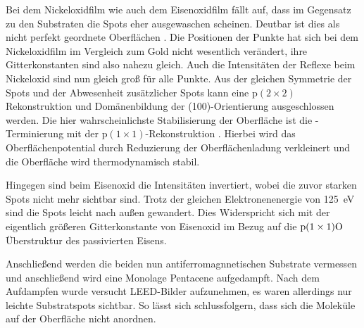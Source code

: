             Bei dem Nickeloxidfilm wie auch dem Eisenoxidfilm fällt auf, dass im Gegensatz zu den Substraten die Spots eher ausgewaschen scheinen.
            Deutbar ist dies als nicht perfekt geordnete Oberflächen \cite{NiO_34}.
            Die Positionen der Punkte hat sich bei dem Nickeloxidfilm im Vergleich zum Gold nicht wesentlich verändert, ihre Gitterkonstanten sind also nahezu gleich.
            Auch die Intensitäten der Reflexe beim Nickeloxid sind nun gleich groß für alle Punkte.
            Aus der gleichen Symmetrie der Spots und der Abwesenheit zusätzlicher Spots kann eine $\text{p}(2 \times 2)$ Rekonstruktion \cite{NiO_37} und Domänenbildung der (100)-Orientierung \cite{NiO_36} ausgeschlossen werden.
            Die hier wahrscheinlichste Stabilisierung der Oberfläche ist die -Terminierung mit der $\text{p}(1 \times 1)$-Rekonstruktion \cite{NiO_35}.
            Hierbei wird das Oberflächenpotential durch Reduzierung der Oberflächenladung verkleinert und die Oberfläche wird thermodynamisch stabil.

            Hingegen sind beim Eisenoxid die Intensitäten invertiert, wobei die zuvor starken Spots nicht mehr sichtbar sind.
            Trotz der gleichen Elektronenenergie von \SI{125}{\electronvolt} sind die Spots leicht nach außen gewandert.
            Dies Widerspricht sich mit der eigentlich größeren Gitterkonstante von Eisenoxid im Bezug auf die $\text{p}(1 \times 1)\ce{O}$ Überstruktur des passivierten Eisens.

            Anschließend werden die beiden nun antiferromagnnetischen Substrate vermessen und anschließend wird eine Monolage Pentacene aufgedampft.
            Nach dem Aufdampfen wurde versucht LEED-Bilder aufzunehmen, es waren allerdings nur leichte Substratspots sichtbar.
            So lässt sich schlussfolgern, dass sich die Moleküle auf der Oberfläche nicht anordnen.

